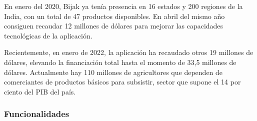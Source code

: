 En enero del 2020, Bijak ya tenía presencia en 16 estados y 200 regiones de la India, con un total de 47 productos disponibles. En abril del mismo año consiguen recaudar 12 millones de dólares para mejorar las capacidades tecnológicas de la aplicación.

Recientemente, en enero de 2022, la aplicación ha recaudado otros 19 millones de dólares, elevando la financiación total hasta el momento de 33,5 millones de dólares. Actualmente hay 110 millones de agricultores que dependen de comerciantes de productos básicos para subsistir, sector que supone el 14 por ciento del PIB del país.

\subsubsection{Funcionalidades}

